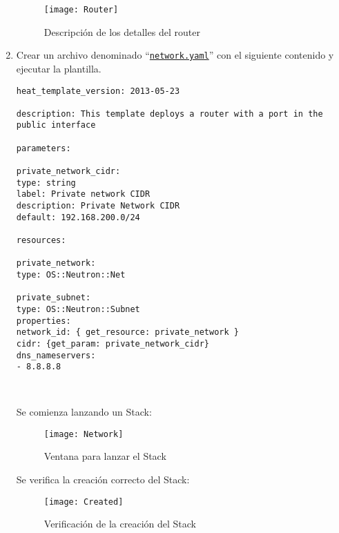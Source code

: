 \documentclass[10pt]{article}   			%
\begin{document}
\begin{enumerate}
\begin{figure}[ht] %
	\centering
	\texttt{[image: Router]}   %
	\caption{Descripción de los detalles del router} \label{fig:Elementos}
\end{figure}


\item Crear un archivo denominado “\texttt{\href{https://github.com/wilrilo/talleres/blob/master/file/taller1/network.yaml}{network.yaml}}” con el siguiente contenido y ejecutar la plantilla.


\begin{small}
	\begin{lstlisting}[frame=single,style=base]	
heat_template_version: 2013-05-23

description: This template deploys a router with a port in the public interface

parameters:

private_network_cidr:
type: string
label: Private network CIDR
description: Private Network CIDR
default: 192.168.200.0/24

resources:

private_network:
type: OS::Neutron::Net

private_subnet:
type: OS::Neutron::Subnet
properties:
network_id: { get_resource: private_network }
cidr: {get_param: private_network_cidr}
dns_nameservers:
- 8.8.8.8

	
	\end{lstlisting}
\end{small}

Se comienza lanzando un Stack:\\


\begin{figure}[H] %
	\centering
	\texttt{[image: Network]}   %
	\caption{Ventana para lanzar el  Stack} \label{fig:Elementos}
\end{figure}

Se verifica la creación correcto del Stack:\\



\begin{figure}[ht] %
	\centering
	\texttt{[image: Created]}   %
	\caption{Verificación de la creación del Stack} \label{fig:Elementos}
\end{figure}


\end{enumerate}
\end{document}
